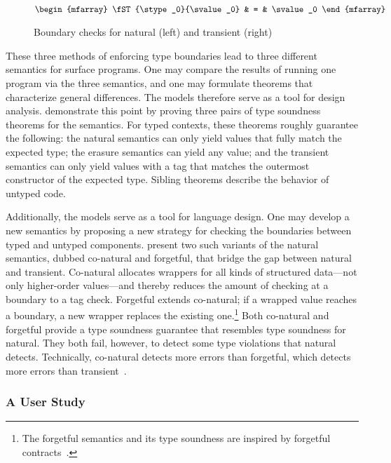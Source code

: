 \begin{figure}[ht]
\begin{minipage}[t]{0.40\columnwidth}
  \fbox{$\STsym : \tpair{\stype}{\svalue} \rightarrow \sexpr$}\\
  \(\begin{mfarray}
    \fST{\stype_0}{\svalue_0}
    & = &
    \svalue_0
  \end{mfarray}\)
  \end{minipage}

  \caption{Boundary checks for natural (left) and transient (right)}
  \label{fig:nt-boundary}
\end{figure}

These three methods of enforcing type boundaries lead to three different
 semantics for surface programs.
One may compare the results of running one program via the three semantics,
 and one may formulate theorems that characterize general differences.
The models therefore serve as a tool for design analysis.
\citet{gf-icfp-2018} demonstrate this point by proving three pairs of type
 soundness theorems for the semantics.
For typed contexts, these theorems roughly guarantee the following:
 the natural semantics can only yield values that fully match the expected type;
 the erasure semantics can yield any value;
 and the transient semantics can only yield values with a tag that matches
 the outermost constructor of the expected type.
Sibling theorems describe the behavior of untyped code.

Additionally, the models serve as a tool for language design.
One may develop a new semantics by proposing a new strategy for checking
 the boundaries between typed and untyped components.
\citet{gf-icfp-2018} present two such variants of the natural semantics,
 dubbed co-natural and forgetful,
 that bridge the gap between natural and transient.
Co-natural allocates wrappers for all kinds of structured data---not only
 higher-order values---and thereby reduces the amount of checking at a boundary
 to a tag check.
Forgetful extends co-natural; if a wrapped value reaches a boundary, a new
 wrapper replaces the existing one.\footnote{The forgetful semantics and its
  type soundness are inspired by forgetful contracts~\cite{g-popl-2015}.}
Both co-natural and forgetful provide a type soundness guarantee that resembles
 type soundness for natural.
They both fail, however, to detect some type violations that natural detects.
Technically, co-natural detects more errors than forgetful, which detects
 more errors than transient~\cite{gf-icfp-2018}.


\subsubsection{A User Study}

